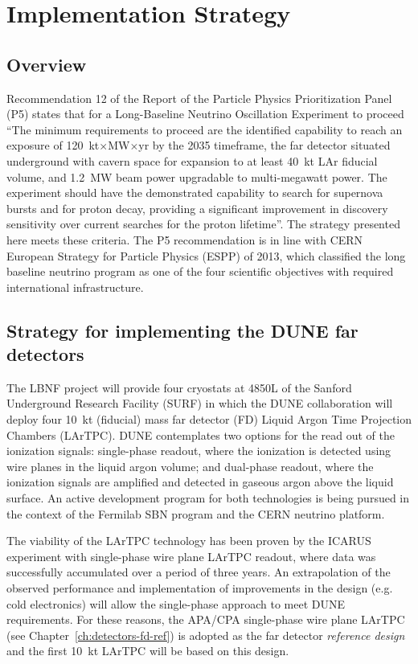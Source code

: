 \chapter{Implementation Strategy}
\label{ch:detectors-strategy}

\section{Overview}

Recommendation 12 of the Report of the Particle Physics Prioritization
Panel (P5) states that for a Long-Baseline Neutrino Oscillation
Experiment to proceed ``The minimum requirements to proceed are the
identified capability to reach an exposure of
120~kt$\times$MW$\times$yr by the 2035 timeframe, the far detector
situated underground with cavern space for expansion to at least 40~kt
LAr fiducial volume, and 1.2~MW beam power upgradable to
multi-megawatt power. The experiment should have the demonstrated
capability to search for supernova bursts and for proton decay,
providing a significant improvement in discovery sensitivity over
current searches for the proton lifetime''.  The strategy presented
here meets these criteria.  The P5 recommendation is in line with CERN
European Strategy for Particle Physics (ESPP) of 2013, which
classified the long baseline neutrino program as one of the four
scientific objectives with required international infrastructure.

\section{Strategy for implementing the DUNE far detectors}

The LBNF project will provide four cryostats at 4850L of the Sanford
Underground Research Facility (SURF) in which the DUNE collaboration
will deploy four 10~kt (fiducial) mass far detector (FD) Liquid Argon Time
Projection Chambers (LArTPC).  DUNE contemplates two options for the
read out of the ionization signals: single-phase readout, where the
ionization is detected using wire planes in the liquid argon volume;
and dual-phase readout, where the ionization signals are amplified and
detected in gaseous argon above the liquid surface.  An active
development program for both technologies is being pursued in the
context of the Fermilab SBN program and the CERN neutrino platform.

The viability of the LArTPC technology has been proven by the ICARUS
experiment with single-phase wire plane LArTPC readout, where data was
successfully accumulated over a period of three years.  An
extrapolation of the observed performance and implementation of
improvements in the design (e.g. cold electronics) will allow the
single-phase approach to meet DUNE requirements. For these reasons,
the APA/CPA single-phase wire plane LArTPC (see
Chapter~\ref{ch:detectors-fd-ref}) is adopted as the far detector
\textit{reference design} and the first 10~kt LArTPC will be based on
this design.

